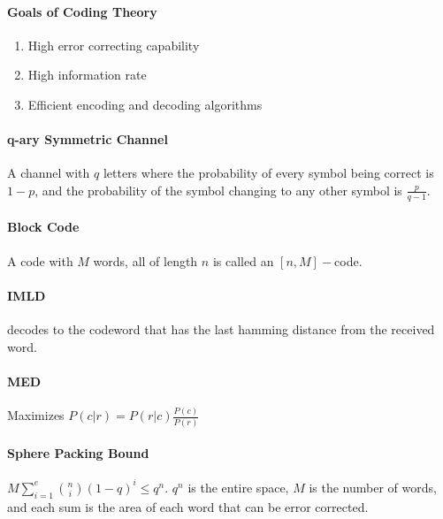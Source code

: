 \documentclass[10pt,letter]{article}
\theoremstyle{plain}
\theoremstyle{definition}
\begin{document}
\paragraph{Goals of Coding Theory}
\begin{enumerate}
    \item High error correcting capability
    \item High information rate 
    \item Efficient encoding and decoding algorithms
\end{enumerate}
\paragraph{q-ary Symmetric Channel} A channel with $q$ letters where the probability of every symbol being correct is $1-p$, and the probability of the symbol changing to any other symbol is $\frac{p}{q-1}$. 
\paragraph{Block Code} A code with $M$ words, all of length $n$ is called an $[n,M]-$code. 
\paragraph{IMLD} decodes to the codeword that has the last hamming distance from the received word.
\paragraph{MED} Maximizes $P(c|r)=P(r|c)\frac{P(c)}{P(r)}$
\paragraph{Sphere Packing Bound}$M\sum_{i=1}^e{n\choose i}(1-q)^i\leq q^n$. $q^n$ is the entire space, $M$ is the number of words, and each sum is the area of each word that can be error corrected. 
\end{document}

